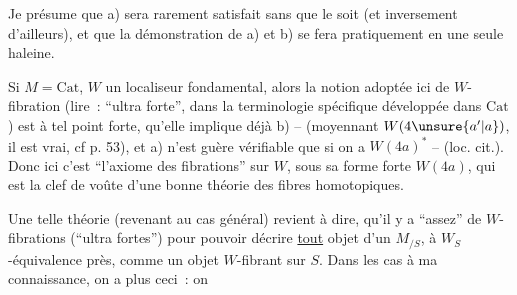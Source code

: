 
Je présume que a) sera rarement satisfait sans que  le soit (et inversement d'ailleurs), et que la démonstration de a) et b) se fera pratiquement en une seule haleine.

Si $M=\mathrm{Cat}$, $W$ un localiseur fondamental, alors la  notion adoptée ici de $W$-fibration (lire~: ``ultra forte'', dans la terminologie spécifique développée dans $\mathrm{Cat}$) est à tel point forte, qu'elle implique déjà  b) -- (moyennant $W(4\unsure{a'|a})$, il est vrai, cf p. 53), et a) n'est guère vérifiable que si on a $W(4a)^{*}$ --
(loc. cit.). Donc ici c'est ``l'axiome des fibrations'' sur $W$, sous sa forme forte $W(4a)$, qui est la clef de voûte d'une bonne théorie des fibres homotopiques.

Une telle théorie (revenant au cas général) revient à dire,  qu'il y a ``assez'' de $W$-fibrations (``ultra fortes'') pour pouvoir décrire \uline{tout} objet d'un $M_{/S}$, à $W_S$-équivalence près, comme un objet $W$-fibrant sur $S$. Dans  les cas à ma connaissance, on a  plus ceci~: on
